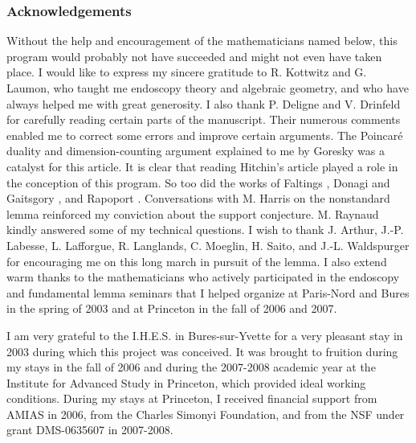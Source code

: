 \documentclass[12pt,english]{smfart}
\numberwithin{equation}{subsection}
\theoremstyle{remark}
\begin{document}
\begin{small}
\subsubsection*{Acknowledgements}
Without the help and encouragement of the mathematicians named below, this program would probably not have succeeded and might not even have taken place. I would like to express my sincere gratitude to R. Kottwitz and G. Laumon, who taught me endoscopy theory and algebraic geometry, and who have always helped me with great generosity. I also thank P. Deligne and V. Drinfeld for carefully reading certain parts of the manuscript. Their numerous comments enabled me to correct some errors and improve certain arguments. The Poincar\'{e} duality and dimension-counting argument explained to me by Goresky was a catalyst for this article. It is clear that reading Hitchin's article \cite{H} played a role in the conception of this program. So too did the works of Faltings \cite{Fa}, Donagi and Gaitsgory \cite{DG}, and Rapoport \cite{Ra}. Conversations with M. Harris on the nonstandard lemma reinforced my conviction about the support conjecture. M. Raynaud kindly answered some of my technical questions. I wish to thank J. Arthur, J.-P. Labesse, L. Lafforgue, R. Langlands, C. Moeglin, H. Saito, and J.-L. Waldspurger for encouraging me on this long march in pursuit of the lemma. I also extend warm thanks to the mathematicians who actively participated in the endoscopy and fundamental lemma seminars that I helped organize at Paris-Nord and Bures in the spring of 2003 and at Princeton in the fall of 2006 and 2007.

I am very grateful to the I.H.E.S. in Bures-sur-Yvette for a very pleasant stay in 2003 during which this project was conceived. It was brought to fruition during my stays in the fall of 2006 and during the 2007-2008 academic year at the Institute for Advanced Study in Princeton, which provided ideal working conditions. During my stays at Princeton, I received financial support from AMIAS in 2006, from the Charles Simonyi Foundation, and from the NSF under grant DMS-0635607 in 2007-2008.
\end{small}

\appendix
\end{document}
